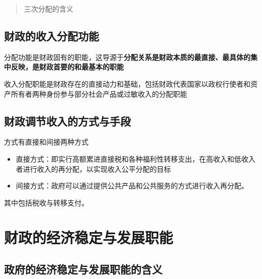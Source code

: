\documentclass[
]{book}
\providecommand{\tightlist}{%
  \setlength{\itemsep}{0pt}\setlength{\parskip}{0pt}}
\theoremstyle{definition}
\theoremstyle{definition}
\theoremstyle{definition}
\theoremstyle{definition}
\theoremstyle{remark}
\begin{document}
\begin{quote}
三次分配的含义
\end{quote}

\hypertarget{ux8d22ux653fux7684ux6536ux5165ux5206ux914dux529fux80fd}{%
\subsection{财政的收入分配功能}\label{ux8d22ux653fux7684ux6536ux5165ux5206ux914dux529fux80fd}}

分配功能是财政固有的职能，这导源于\textbf{分配关系是财政本质的最直接、最具体的集中反映，是财政首要的和最基本的职能}

收入分配职能是财政存在的直接动力和基础，包括财政代表国家以政权行使者和资产所有者两种身份参与部分社会产品或过敏收入的分配职能

\hypertarget{ux8d22ux653fux8c03ux8282ux6536ux5165ux7684ux65b9ux5f0fux4e0eux624bux6bb5}{%
\subsection{财政调节收入的方式与手段}\label{ux8d22ux653fux8c03ux8282ux6536ux5165ux7684ux65b9ux5f0fux4e0eux624bux6bb5}}

方式有直接和间接两种方式

\begin{itemize}
\tightlist
\item
  直接方式：即实行高额累进直接税和各种福利性转移支出，在高收入和低收入者进行收入的再分配，以实现收入公平分配的目标
\item
  间接方式：政府可以通过提供公共产品和公共服务的方式进行收入再分配。
\end{itemize}

其中包括税收与转移支付。

\hypertarget{ux8d22ux653fux7684ux7ecfux6d4eux7a33ux5b9aux4e0eux53d1ux5c55ux804cux80fd}{%
\section{财政的经济稳定与发展职能}\label{ux8d22ux653fux7684ux7ecfux6d4eux7a33ux5b9aux4e0eux53d1ux5c55ux804cux80fd}}

\hypertarget{ux653fux5e9cux7684ux7ecfux6d4eux7a33ux5b9aux4e0eux53d1ux5c55ux804cux80fdux7684ux542bux4e49}{%
\subsection{政府的经济稳定与发展职能的含义}\label{ux653fux5e9cux7684ux7ecfux6d4eux7a33ux5b9aux4e0eux53d1ux5c55ux804cux80fdux7684ux542bux4e49}}
\end{document}
